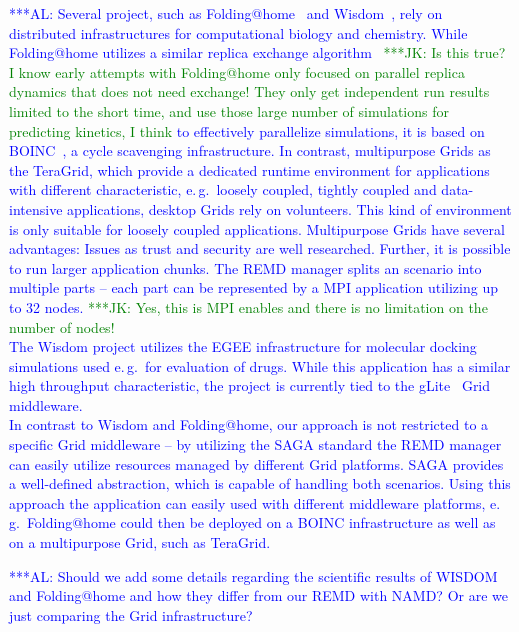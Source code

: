 \documentclass[times, 10pt,twocolumn]{article}
\newcommand{\kimnote}[1]{ {\textcolor{green} { ***JK: #1 }}}
\newcommand{\alnote}[1]{ {\textcolor{blue} { ***AL: #1 }}}
\begin{document}
\alnote{Several project, such as Folding@home~\cite{folding} and Wisdom~\cite{wisdom}, rely on distributed infrastructures for computational biology and chemistry. While Folding@home utilizes a similar replica exchange algorithm~\cite{PhysRevLett.86.4983} \kimnote{Is this true? I know early attempts with Folding@home only focused on parallel replica dynamics that does not need exchange!  They only get independent run results limited to the short time, and use those large number of simulations for predicting kinetics, I think}
to effectively parallelize simulations, it is based on BOINC~\cite{1033223}, a cycle scavenging infrastructure. 
In contrast, multipurpose Grids as the TeraGrid, which provide a dedicated runtime environment for applications with different characteristic, e.\,g.\ loosely coupled, tightly coupled and data-intensive applications, desktop Grids rely on volunteers. This kind of environment is only suitable for loosely coupled applications. Multipurpose Grids have several advantages: Issues as trust and security are well researched. Further, it is possible to run larger application chunks. The REMD manager splits an scenario into multiple parts -- each part can be represented by a MPI application utilizing up to 32 nodes. \kimnote{Yes, this is MPI enables and there is no limitation on the number of nodes!}\\  
The Wisdom project utilizes the EGEE infrastructure for molecular docking simulations used e.\,g.\ for evaluation of drugs. While this application has a similar high throughput characteristic, the project is currently tied to the gLite~\cite{glite2008} Grid middleware.                      \\                             
In contrast to Wisdom and Folding@home, our approach is not restricted to a specific Grid middleware -- by utilizing the SAGA standard the REMD manager can easily utilize resources managed by different Grid platforms. SAGA provides a well-defined abstraction, which is capable of handling both scenarios. Using this approach the application can easily used with different middleware platforms, e.\,g.\ Folding@home could then be deployed on a BOINC infrastructure as well as on a multipurpose Grid, such as TeraGrid.                                                                                                                                                         
}

\alnote{Should we add some  details regarding  the scientific results of WISDOM and Folding@home and how they differ from
our REMD with NAMD? Or are we just comparing the Grid infrastructure?
}  
                       
\end{document}
